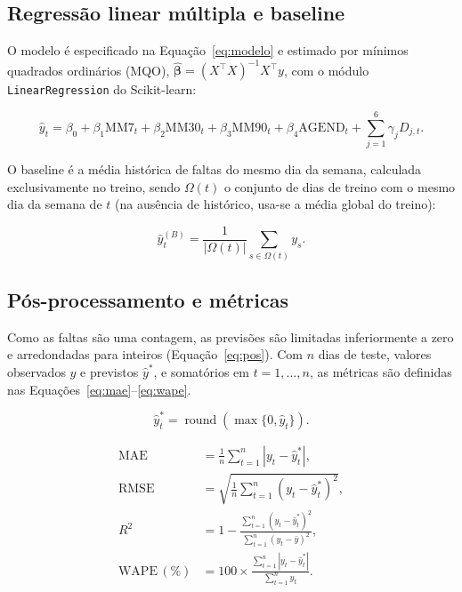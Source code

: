 \documentclass[11pt]{article}
\begin{document}
\subsection{Regressão linear múltipla e baseline}

O modelo é especificado na Equação~\ref{eq:modelo} e estimado por mínimos quadrados ordinários (MQO), $\hat{\boldsymbol{\beta}}=(X^{\top}X)^{-1}X^{\top}y$, com o módulo \texttt{LinearRegression} do Scikit-learn:

\begin{equation}
\hat{y}_t = \beta_0 + \beta_1\mathrm{MM7}_t + \beta_2\mathrm{MM30}_t + \beta_3\mathrm{MM90}_t + \beta_4\mathrm{AGEND}_t + \sum_{j=1}^{6}\gamma_j D_{j,t}.
\label{eq:modelo}
\end{equation}

O baseline é a média histórica de faltas do mesmo dia da semana, calculada exclusivamente no treino, sendo $\Omega(t)$ o conjunto de dias de treino com o mesmo dia da semana de $t$ (na ausência de histórico, usa-se a média global do treino):

\begin{equation}
\hat{y}_t^{(B)} = \frac{1}{|\Omega(t)|}\sum_{s\in\Omega(t)}y_s.
\label{eq:baseline}
\end{equation}

\subsection{Pós-processamento e métricas}

Como as faltas são uma contagem, as previsões são limitadas inferiormente a zero e arredondadas para inteiros (Equação~\ref{eq:pos}). Com $n$ dias de teste, valores observados $y$ e previstos $\hat{y}^{*}$, e somatórios em $t=1,\ldots,n$, as métricas são definidas nas Equações~\ref{eq:mae}--\ref{eq:wape}.

\begin{equation}
\hat{y}^{*}_t = \operatorname{round}\!\left(\max\{0,\hat{y}_t\}\right).
\label{eq:pos}
\end{equation}

\begin{subequations}\label{eq:metricas}
\begin{align}
\mathrm{MAE} &= \frac{1}{n}\sum_{t=1}^{n}|y_t-\hat{y}^{*}_t|, \label{eq:mae}\\
\mathrm{RMSE} &= \sqrt{\frac{1}{n}\sum_{t=1}^{n}(y_t-\hat{y}^{*}_t)^2}, \label{eq:rmse}\\
R^2 &= 1-\frac{\sum_{t=1}^{n}(y_t-\hat{y}^{*}_t)^2}{\sum_{t=1}^{n}(y_t-\bar{y})^2}, \label{eq:r2}\\
\mathrm{WAPE}\,(\%) &= 100\times\frac{\sum_{t=1}^{n}|y_t-\hat{y}^{*}_t|}{\sum_{t=1}^{n}y_t}. \label{eq:wape}
\end{align}
\end{subequations}
\end{document}
